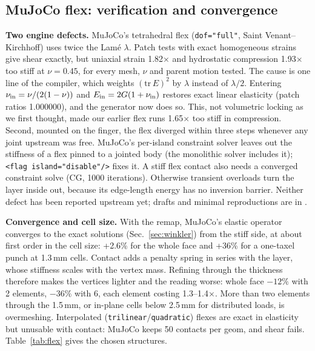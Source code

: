 \documentclass[10pt,twocolumn]{article}
\newcommand{\code}[1]{\texttt{\small #1}}
\begin{document}
\subsection{MuJoCo flex: verification and convergence}\label{sec:rev-flex}
\textbf{Two engine defects.} MuJoCo's tetrahedral flex (\code{dof="full"}, Saint Venant--Kirchhoff) uses twice
the Lam\'e $\lambda$. Patch tests with exact homogeneous strains give shear exactly, but uniaxial strain 1.82$\times$
and hydrostatic compression 1.93$\times$ too stiff at $\nu=0.45$, for every mesh, $\nu$ and parent motion tested. The
cause is one line of the compiler, which weights $(\mathrm{tr}\,E)^2$ by $\lambda$ instead of $\lambda/2$. Entering
$\nu_{\rm in}=\nu/(2(1-\nu))$ and $E_{\rm in}=2G(1+\nu_{\rm in})$ restores exact linear elasticity (patch ratios
1.000000), and the generator now does so. This, not volumetric locking as we first thought, made our earlier flex runs 1.65$\times$ too
stiff in compression. Second, mounted on the finger, the flex diverged within three steps whenever any joint upstream was
free. MuJoCo's per-island constraint solver leaves out the stiffness of a flex pinned to a jointed body (the
monolithic solver includes it); \code{<flag island="disable"/>} fixes it. A stiff flex contact also needs a converged
constraint solve (CG, 1000 iterations). Otherwise transient overloads turn the layer inside out, because its
edge-length energy has no inversion barrier. Neither defect has been reported upstream yet; drafts and minimal
reproductions are in \cite{flexstudy}.

\textbf{Convergence and cell size.} With the remap, MuJoCo's elastic operator converges to the exact solutions
(Sec.~\ref{sec:winkler}) from the stiff side, at about first order in the cell size: +2.6\% for the whole face and
+36\% for a one-taxel punch at 1.3\,mm cells. Contact adds a penalty spring in series with the layer, whose stiffness
scales with the vertex mass. Refining through the thickness therefore makes the vertices lighter and the reading
worse: whole face $-12\%$ with 2 elements, $-36\%$ with 6, each element costing 1.3--1.4$\times$. More than two
elements through the 1.5\,mm, or in-plane cells below 2.5\,mm for distributed loads, is overmeshing. Interpolated
(\code{trilinear}/\code{quadratic}) flexes are exact in elasticity but unusable with contact: MuJoCo keeps 50
contacts per geom, and shear fails. Table~\ref{tab:flex} gives the chosen structures.
\end{document}
